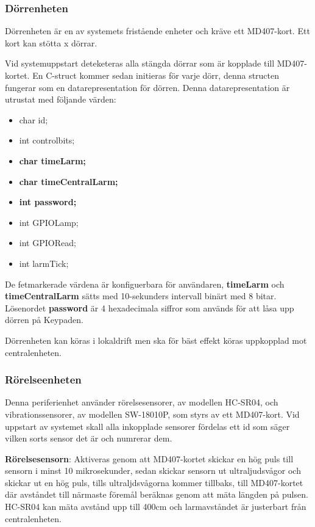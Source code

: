 \documentclass{article}
\begin{document}
\subsubsection{Dörrenheten}

Dörrenheten är en av systemets fristående enheter och kräve ett MD407-kort. Ett kort kan stötta x dörrar.

Vid systemuppstart deteketeras alla stängda dörrar som är kopplade till MD407-kortet. En C-struct kommer sedan initieras för varje dörr, denna structen fungerar som en datarepresentation för dörren. Denna datarepresentation är utrustat med följande värden:
\begin{itemize}
  \item {char id;}
  \item {int controlbits;} 
  \item \textbf{char time\textunderscore{}Larm;}
  \item \textbf{char time\textunderscore{}Central\textunderscore{}Larm;}
  \item \textbf{int password;}
  \item int GPIO\textunderscore{}Lamp;
  \item int GPIO\textunderscore{}Read;
  \item int larmTick;
\end{itemize}

De fetmarkerade värdena är konfiguerbara för användaren, \textbf{time\textunderscore{}Larm} och \\ \textbf{time\textunderscore{}Central\textunderscore{}Larm} sätts med 10-sekunders intervall binärt med 8 bitar. Lösenordet \textbf{password} är 4 hexadecimala siffror som används för att låsa upp dörren på Keypaden.

Dörrenheten kan köras i lokaldrift
men ska för bäst effekt köras uppkopplad mot centralenheten.\\
\subsubsection{Rörelseenheten}
Denna periferienhet använder rörelsesensorer, av modellen HC-SR04, och vibrationssensorer, av modellen SW-18010P, som styrs av ett MD407-kort. 
Vid uppstart av systemet skall alla inkopplade sensorer fördelas ett id som säger vilken sorts sensor det är och numrerar dem.

\textbf{Rörelsesensorn}: Aktiveras genom att MD407-kortet skickar en hög puls till sensorn i minst 10 mikrosekunder, sedan skickar sensorn ut ultraljudsvågor och skickar ut en hög puls, tills ultraljdsvågorna kommer tillbaks,  till MD407-kortet där avståndet till närmaste föremål beräknas genom att mäta längden på pulsen. HC-SR04 kan mäta avstånd upp till 400cm och larmavståndet är justerbart från centralenheten.
\end{document}
